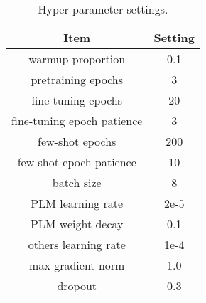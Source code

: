 \begin{table}
    \centering
    \begin{tabular}[h]{cc}
        \toprule
        Item & Setting \\
        \midrule
            warmup proportion & 0.1 \\
            pretraining epochs & 3 \\
            fine-tuning epochs & 20 \\
            fine-tuning epoch patience & 3 \\
            few-shot epochs & 200 \\
            few-shot epoch patience & 10 \\
            batch size & 8 \\
            PLM learning rate & 2e-5 \\
            PLM weight decay & 0.1 \\
            others learning rate & 1e-4 \\
            max gradient norm & 1.0 \\
            dropout & 0.3 \\
        \bottomrule
    \end{tabular}
    \caption{
        Hyper-parameter settings.
    }
    \label{tab:hyper-param}
\end{table}
